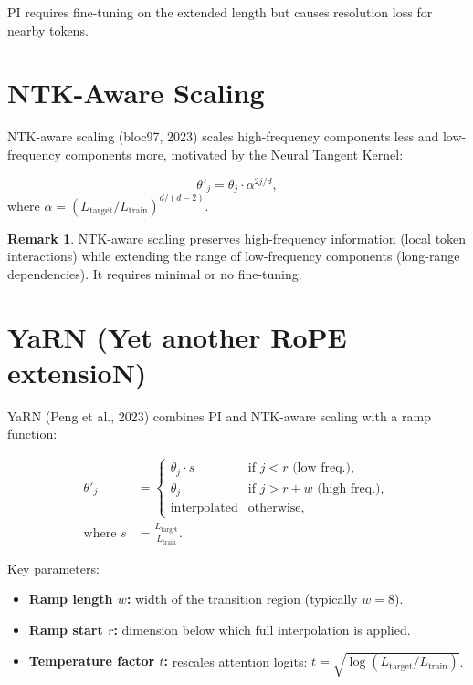 \documentclass[11pt,a4paper]{book}
\theoremstyle{definition}
\newtheorem{remark}{Remark}[chapter]
\begin{document}
PI requires fine-tuning on the extended length but causes resolution loss for nearby tokens.

\section{NTK-Aware Scaling}

NTK-aware scaling (bloc97, 2023) scales high-frequency components less and low-frequency components more, motivated by the Neural Tangent Kernel:

\begin{equation}
	\theta'_j = \theta_j \cdot \alpha^{2j/d},
\end{equation}
where $\alpha = (L_{\text{target}} / L_{\text{train}})^{d/(d-2)}$.

\begin{remark}
	NTK-aware scaling preserves high-frequency information (local token interactions) while extending the range of low-frequency components (long-range dependencies). It requires minimal or no fine-tuning.
\end{remark}

\section{YaRN (Yet another RoPE extensioN)}

YaRN (Peng et al., 2023) combines PI and NTK-aware scaling with a ramp function:

\begin{align}
	\theta'_j       & =
	\begin{cases}
		\theta_j \cdot s    & \text{if } j < r \text{ (low freq.)},      \\
		\theta_j            & \text{if } j > r + w \text{ (high freq.)}, \\
		\text{interpolated} & \text{otherwise},
	\end{cases} \\
	\text{where } s & = \frac{L_{\text{target}}}{L_{\text{train}}}.
\end{align}

Key parameters:
\begin{itemize}
	\item \textbf{Ramp length $w$:} width of the transition region (typically $w = 8$).
	\item \textbf{Ramp start $r$:} dimension below which full interpolation is applied.
	\item \textbf{Temperature factor $t$:} rescales attention logits: $t = \sqrt{\log(L_{\text{target}} / L_{\text{train}})}$.
\end{itemize}
\end{document}
